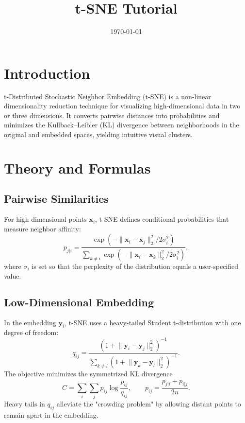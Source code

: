 ﻿\documentclass[12pt]{article}
\title{t-SNE Tutorial}
\author{}
\date{\today}
\begin{document}
\maketitle

\section{Introduction}
t-Distributed Stochastic Neighbor Embedding (t-SNE) is a non-linear dimensionality reduction technique for visualizing high-dimensional data in two or three dimensions. It converts pairwise distances into probabilities and minimizes the Kullback--Leibler (KL) divergence between neighborhoods in the original and embedded spaces, yielding intuitive visual clusters.

\section{Theory and Formulas}
\subsection{Pairwise Similarities}
For high-dimensional points \(\mathbf{x}_i\), t-SNE defines conditional probabilities that measure neighbor affinity:
\begin{equation}
p_{j|i} = \frac{\exp\left(-\lVert \mathbf{x}_i - \mathbf{x}_j \rVert_2^2 / 2\sigma_i^2\right)}{\sum_{k \neq i} \exp\left(-\lVert \mathbf{x}_i - \mathbf{x}_k \rVert_2^2 / 2\sigma_i^2\right)},
\end{equation}
where \(\sigma_i\) is set so that the perplexity of the distribution equals a user-specified value.

\subsection{Low-Dimensional Embedding}
In the embedding \(\mathbf{y}_i\), t-SNE uses a heavy-tailed Student t-distribution with one degree of freedom:
\begin{equation}
q_{ij} = \frac{\left(1 + \lVert \mathbf{y}_i - \mathbf{y}_j \rVert_2^2\right)^{-1}}{\sum_{k \neq l} \left(1 + \lVert \mathbf{y}_k - \mathbf{y}_l \rVert_2^2\right)^{-1}}.
\end{equation}
The objective minimizes the symmetrized KL divergence
\begin{equation}
C = \sum_i \sum_j p_{ij} \log \frac{p_{ij}}{q_{ij}}, \qquad p_{ij} = \frac{p_{j|i} + p_{i|j}}{2n}.
\end{equation}
Heavy tails in \(q_{ij}\) alleviate the "crowding problem" by allowing distant points to remain apart in the embedding.
\end{document}
